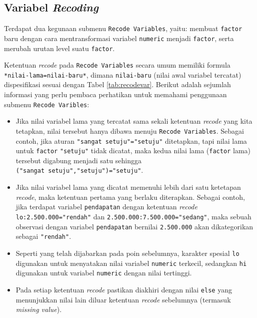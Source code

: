 \documentclass[12pt,]{krantz}
\providecommand{\tightlist}{%
  \setlength{\itemsep}{0pt}\setlength{\parskip}{0pt}}
\begin{document}
\hypertarget{revar}{%
\subsection{\texorpdfstring{Variabel \emph{Recoding}}{Variabel Recoding}}\label{revar}}

Terdapat dua kegunaan submenu \texttt{Recode\ Variables}, yaitu: membuat \texttt{factor} baru dengan cara mentransformasi variabel \texttt{numeric} menjadi \texttt{factor}, serta merubah urutan level suatu \texttt{factor}.

Ketentuan \emph{recode} pada \texttt{Recode\ Variables} secara umum memiliki formula \texttt{*nilai-lama=nilai-baru*}, dimana \texttt{nilai-baru} (nilai awal variabel tercatat) dispesifikasi sesuai dengan Tabel \ref{tab:recodevar}. Berikut adalah sejumlah informasi yang perlu pembaca perhatikan untuk memahami penggunaan submenu \texttt{Recode\ Varibles}:

\begin{itemize}
\tightlist
\item
  Jika nilai variabel lama yang tercatat sama sekali ketentuan \emph{recode} yang kita tetapkan, nilai tersebut hanya dibawa menuju \texttt{Recode\ Variables}. Sebagai contoh, jika aturan \texttt{"sangat\ setuju"="setuju"} ditetapkan, tapi nilai lama untuk \texttt{factor} \texttt{"setuju"} tidak dicatat, maka kedua nilai lama (\texttt{factor} lama) tersebut digabung menjadi satu sehingga \texttt{("sangat\ setuju","setuju")="setuju"}.
\item
  Jika nilai variabel lama yang dicatat memenuhi lebih dari satu ketetapan \emph{recode}, maka ketentuan pertama yang berlaku diterapkan. Sebagai contoh, jika terdapat variabel \texttt{pendapatan} dengan ketentuan \emph{recode} \texttt{lo:2.500.000="rendah"} dan \texttt{2.500.000:7.500.000="sedang"}, maka sebuah observasi dengan variabel \texttt{pendapatan} bernilai \texttt{2.500.000} akan dikategorikan sebagai \texttt{"rendah"}.
\item
  Seperti yang telah dijabarkan pada poin sebelumnya, karakter spesial \texttt{lo} digunakan untuk menyatakan nilai variabel \texttt{numeric} terkecil, sedangkan \texttt{hi} digunakan untuk variabel \texttt{numeric} dengan nilai tertinggi.
\item
  Pada setiap ketentuan \emph{recode} pastikan diakhiri dengan nilai \texttt{else} yang menunjukkan nilai lain diluar ketentuan \emph{recode} sebelumnya (termasuk \emph{missing value}).
\end{itemize}
\end{document}
